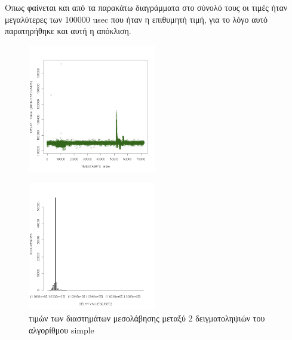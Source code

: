 \documentclass[12pt, a4paper]{article}
\begin{document}
\justify
Οπως φαίνεται και από τα παρακάτω διαγράμματα στο σύνολό τους οι τιμές ήταν μεγαλύτερες των 100000 \textlatin{usec} που ήταν η επιθυμητή τιμή, για το λόγο αυτό παρατηρήθηκε και αυτή η απόκλιση. 
\begin{figure}[H]
        
        \caption{}
        \centering
        \includegraphics[width=0.5\textwidth]{images/simple.png}
\end{figure}
\begin{figure}[H]
    \caption{ τιμών των διαστημάτων μεσολάβησης μεταξύ 2 δειγματοληψιών του αλγορίθμου \textlatin{simple}}
    \centering
    \includegraphics[width=0.5\textwidth]{images/simple_distribution.png}

\end{figure}
\pagebreak
\end{document}
